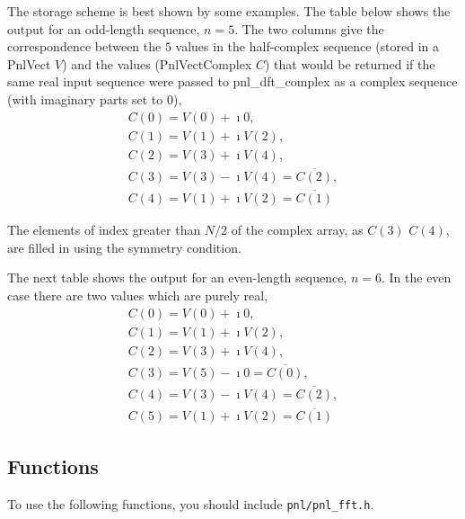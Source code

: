 The storage scheme is best shown by some examples. The table below shows the
output for an odd-length sequence, $n=5$.  The two columns give the
correspondence between the $5$ values in the half-complex sequence (stored in
a PnlVect $V$) and the values (PnlVectComplex $C$) that would be returned if
the same real input sequence were passed to pnl_dft_complex as a complex
sequence (with imaginary parts set to 0),
\begin{equation}
  \begin{array}{l}
    C(0) =  V(0) + \imath 0, \\
    C(1) =  V(1) + \imath V(2), \\
    C(2) =  V(3) + \imath V(4), \\
    C(3) = V(3) - \imath V(4)=  \overline{C(2)} , \\
    C(4) = V(1) + \imath V(2)=  \overline{C(1)}
  \end{array}
\end{equation}

The elements of index greater than $N/2$ of the complex array, as $C(3)$
$C(4)$, are filled in using the symmetry condition.

The next table shows the output for an even-length sequence, $n=6$.
In the even case there are two values which are purely real,
\begin{equation}
  \begin{array}{l}
    C(0) =  V(0) + \imath 0, \\
    C(1) =  V(1) + \imath V(2), \\
    C(2) =  V(3) + \imath V(4), \\
    C(3) = V(5) - \imath 0    =  \overline{C(0)} , \\
    C(4) = V(3) - \imath V(4) =  \overline{C(2)} , \\
    C(5) = V(1) + \imath V(2) =  \overline{C(1)}
  \end{array}
\end{equation}


\subsection{Functions}

To use the following functions, you should include \verb!pnl/pnl_fft.h!.

